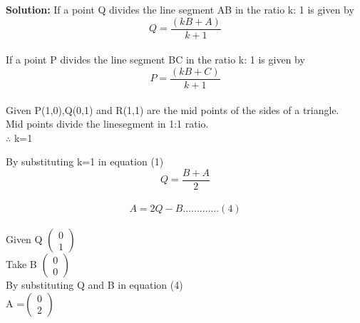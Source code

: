 \documentclass[10pt,a4paper]{report}
\begin{document}
\begin{multicols}{2}
\textbf{Solution:}
If a point Q divides the line segment AB in the ratio k: 1 is given by
\begin{equation}
Q= \frac{(kB + A)}{k+1} 
\end{equation}
\\
\vspace{2mm}
If a point P divides the line segment BC in the ratio k: 1 is given by
\begin{equation}
P= \frac{(kB + C)}{k+1} 
\end{equation} \\

\vspace{3mm} 
Given P(1,0),Q(0,1) and R(1,1) are the mid points of the sides of a triangle.\\
Mid points divide the linesegment in 1:1 ratio.\\

$\therefore$  k=1
 
\vspace{2mm}
By substituting k=1 in equation (1) \\
\vspace{2mm}
\begin{equation}
Q= \frac{B+A}{2}
\end{equation}\\
\begin{equation}
 A=2Q-B .............(4)
\end{equation} \\
 Given Q  $ \begin{pmatrix} 
0 \\
1
\end{pmatrix} $  \\
Take B $ \begin{pmatrix} 
0 \\
0
\end{pmatrix} $ \\By substituting Q and B in equation (4)\\
\vspace{3mm}
A =$ \begin{pmatrix} 
0 \\
2
\end{pmatrix} $ \\


\end{multicols}
\end{document}
